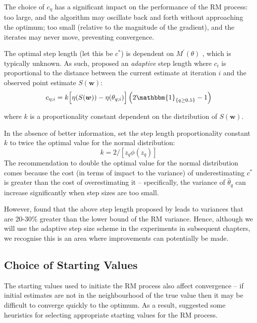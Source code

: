 The choice of $c_\eta$ has a significant impact on the performance of the RM process: too large, and the algorithm may oscillate back and forth without approaching the optimum; too small (relative to the magnitude of the gradient), and the iterates may never move, preventing convergence.

The optimal step length (let this be $c^*$) is dependent on $M^\prime(\theta)$ \cite{LlyodBotev2015}, which is typically unknown. As such, \citet{Garthwaite1992} proposed an \textit{adaptive} step length where $c_i$ is proportional to the distance between the current estimate at iteration $i$ and the observed point estimate $S(\bm{w})$:
\begin{equation}
    c_{\eta; i} = k\Big[\eta(S(\bm{w})) - \eta(\theta_{q; i})\Big] \left( 2\mathbbm{1}_{\{q \geq 0.5\}} - 1 \right)
\end{equation}

where $k$ is a proportionality constant dependent on the distribution of $S(\bm{w})$.

In the absence of better information, \citet{Garthwaite1992} set the step length proportionality constant $k$ to twice the optimal value for the normal distribution: \[
k = 2/\left[z_q \phi(z_q) \right]
\]
The recommendation to double the optimal value for the normal distribution comes because the cost (in terms of impact to the variance) of underestimating $c^*$ is greater than the cost of overestimating it -- specifically, the variance of $\hat\theta_q$ can increase significantly when step sizes are too small.

However, \citet{LlyodBotev2015} found that the above step length proposed by \citet{Garthwaite1992} leads to variances that are 20-30\% greater than the lower bound of the RM variance. Hence, although we will use the adaptive step size scheme in the experiments in subsequent chapters, we recognise this is an area where improvements can potentially be made.

\subsection{Choice of Starting Values}

The starting values used to initiate the RM process also affect convergence -- if initial estimates are not in the neighbourhood of the true value then it may be difficult to converge quickly to the optimum. As a result, \citet{Garthwaite1992} suggested some heuristics for selecting appropriate starting values for the RM process.

